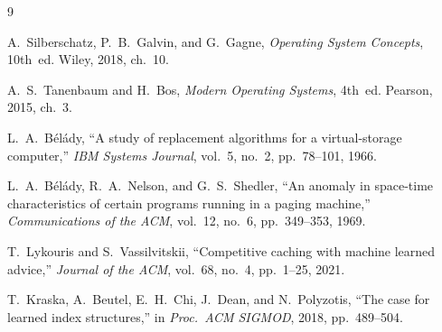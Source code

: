 \documentclass[11pt, a4paper]{article}
\begin{document}

\begin{thebibliography}{9}

A.~Silberschatz, P.~B.~Galvin, and G.~Gagne,
\textit{Operating System Concepts}, 10th~ed.
Wiley, 2018, ch.~10.

A.~S.~Tanenbaum and H.~Bos,
\textit{Modern Operating Systems}, 4th~ed.
Pearson, 2015, ch.~3.

L.~A.~B\'{e}l\'{a}dy,
``A study of replacement algorithms for a virtual-storage computer,''
\textit{IBM Systems Journal}, vol.~5, no.~2, pp.~78--101, 1966.

L.~A.~B\'{e}l\'{a}dy, R.~A.~Nelson, and G.~S.~Shedler,
``An anomaly in space-time characteristics of certain programs running in a paging machine,''
\textit{Communications of the ACM}, vol.~12, no.~6, pp.~349--353, 1969.

T.~Lykouris and S.~Vassilvitskii,
``Competitive caching with machine learned advice,''
\textit{Journal of the ACM}, vol.~68, no.~4, pp.~1--25, 2021.

T.~Kraska, A.~Beutel, E.~H.~Chi, J.~Dean, and N.~Polyzotis,
``The case for learned index structures,''
in \textit{Proc.\ ACM SIGMOD}, 2018, pp.~489--504.

\end{thebibliography}
\end{document}
